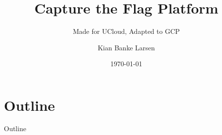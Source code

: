 \documentclass{beamer}
\title{Capture the Flag Platform}
\subtitle{Made for UCloud, Adapted to GCP\\ \vspace{17pt} \vspace{-10pt}}
\author[K. B. Larsen]{Kian Banke Larsen}
\institute{Southern University of Denmark}
\date{\today}
\begin{document}
\begin{frame}
\titlepage
\end{frame}

\section{Outline}
\begin{frame}{Outline}
\tableofcontents
\end{frame}
\end{document}
